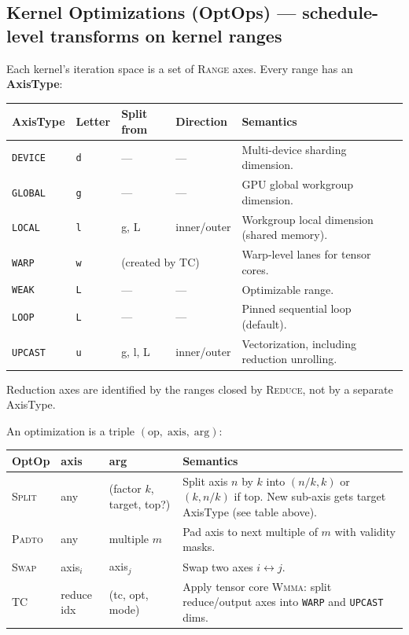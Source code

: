 \documentclass[10pt,letterpaper]{article}
\newcommand{\op}[1]{\textsc{#1}}
\begin{document}
\subsection*{Kernel Optimizations (OptOps) \normalfont\small--- schedule-level transforms on kernel ranges}

Each kernel's iteration space is a set of \op{Range} axes. Every range has an \textbf{AxisType}:

\medskip
\begin{tabular}{@{}l l l l l@{}}
\toprule
\textbf{AxisType} & \textbf{Letter} & \textbf{Split from} & \textbf{Direction} & \textbf{Semantics} \\
\midrule
{\color{axgreen}\texttt{DEVICE}} & \texttt{d} & --- & --- & Multi-device sharding dimension. \\
{\color{axblue}\texttt{GLOBAL}} & \texttt{g} & --- & --- & GPU global workgroup dimension. \\
{\color{axcyan}\texttt{LOCAL}} & \texttt{l} & g, L & inner/outer & Workgroup local dimension (shared memory). \\
{\color{axbrcyan}\texttt{WARP}} & \texttt{w} & \multicolumn{2}{l}{(created by \op{TC})} & Warp-level lanes for tensor cores. \\
{\color{axwhite}\texttt{WEAK}} & \texttt{L} & --- & --- & Optimizable range. \\
{\color{axwhite}\texttt{LOOP}} & \texttt{L} & --- & --- & Pinned sequential loop (default). \\
{\color{axyellow}\texttt{UPCAST}} & \texttt{u} & g, l, L & inner/outer & Vectorization, including reduction unrolling. \\
\bottomrule
\end{tabular}

\medskip
Reduction axes are identified by the ranges closed by \op{Reduce}, not by a separate AxisType.

\medskip
An optimization is a triple $(\mathrm{op},\;\mathrm{axis},\;\mathrm{arg})$:

\smallskip
\begin{tabular}{@{}l l l p{6.5cm}@{}}
\toprule
\textbf{OptOp} & \textbf{axis} & \textbf{arg} & \textbf{Semantics} \\
\midrule
\op{Split} & any & (factor $k$, target, top?) &
  Split axis $n$ by $k$ into $(n/k, k)$ or $(k, n/k)$ if top. New sub-axis gets target AxisType (see table above). \\
\op{Padto} & any & multiple $m$ &
  Pad axis to next multiple of $m$ with validity masks. \\[4pt]
\op{Swap} & axis$_i$ & axis$_j$ &
  Swap two axes $i \leftrightarrow j$. \\
\op{TC} & reduce idx & (tc, opt, mode) &
  Apply tensor core \op{Wmma}: split reduce/output axes into \texttt{WARP} and \texttt{UPCAST} dims. \\
\bottomrule
\end{tabular}
\end{document}
